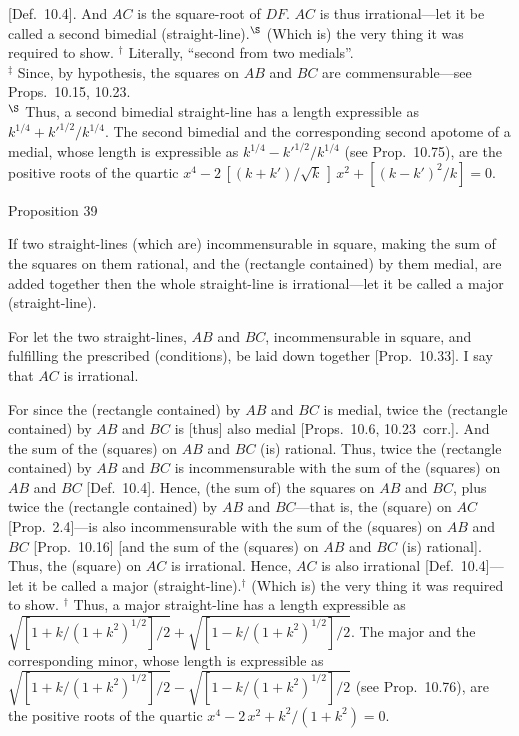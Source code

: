 [Def.~10.4]. And  $AC$ is the square-root of $DF$. $AC$ is thus irrational---let it be called a second bimedial (straight-line).$^\S$ (Which is) the very thing it was required to show.
{\footnotesize\noindent$^\dag$ Literally, 
``second from two medials''.\\[0.5ex]
$^\ddag$ Since, by hypothesis, the squares on $AB$ and $BC$ are commensurable---see Props.~10.15, 10.23.\\[0.5ex]
$^\S$ Thus, a second bimedial straight-line
has a length expressible as $k^{1/4}+k'^{1/2}/k^{1/4}$. The second bimedial and the corresponding second apotome of a medial, whose length is expressible as
$k^{1/4}-k'^{1/2}/k^{1/4}$ (see Prop.~10.75), are
the positive roots of the quartic $x^4-2\,[(k+k')/\sqrt{k}\,]\,x^2+ [(k-k')^2/k] = 0$.}


\begin{center}
{\large Proposition 39}
\end{center}

If two straight-lines (which are) incommensurable
in square, making the sum of the squares on them
rational, and the (rectangle contained) by them medial,  are added together then the whole
straight-line is irrational---let it be called a major (straight-line).

\epsfysize=0.3in
\centerline{}

For let the two straight-lines, $AB$ and $BC$,  incommensurable
in square, and fulfilling  the  prescribed (conditions), be laid down together [Prop.~10.33]. I say that $AC$ is irrational.

For since the (rectangle contained) by $AB$ and $BC$ is medial, twice
the (rectangle contained) by $AB$ and $BC$ is [thus] also medial [Props.~10.6, 10.23~corr.].
And the sum of the (squares) on $AB$ and $BC$ (is) rational. Thus, twice
the (rectangle contained) by $AB$ and $BC$ is incommensurable with the
sum of the (squares) on $AB$ and $BC$ [Def.~10.4].
Hence, (the sum of) the squares on $AB$ and $BC$, plus twice the
(rectangle contained) by $AB$ and $BC$---that is, the (square) on $AC$ [Prop.~2.4]---is also
incommensurable with the sum of the (squares) on $AB$ and $BC$
[Prop.~10.16] [and the
sum of the (squares) on $AB$ and $BC$ (is) rational]. Thus, the (square) on $AC$ is irrational. Hence, $AC$ is also irrational [Def.~10.4]---let it be called a major (straight-line).$^\dag$ (Which is) the
very thing it was required to show.
{\footnotesize\noindent$^\dag$ Thus, a major straight-line
has a length expressible as $\sqrt{[1+k/(1+k^2)^{1/2}]/2} + \sqrt{[1-k/(1+k^2)^{1/2}]/2}$. The major and the corresponding minor, whose length is expressible as $\sqrt{[1+k/(1+k^2)^{1/2}]/2} - \sqrt{[1-k/(1+k^2)^{1/2}]/2}$ (see Prop.~10.76), are
the positive roots of the quartic $x^4-2\,x^2+ k^2/(1+k^2) = 0$.}

